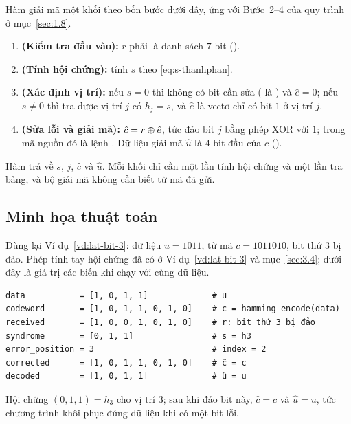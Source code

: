 Hàm  giải mã một khối theo bốn bước dưới đây, ứng với
Bước~2--4 của quy trình ở mục~\ref{sec:1.8}.
\begin{enumerate}[label=\textbf{Bước~\arabic*},leftmargin=2.3cm,labelwidth=1.7cm,labelsep=0.6em,align=left]
  \item \textbf{(Kiểm tra đầu vào):} $r$ phải là danh sách $7$ bit
        ().
  \item \textbf{(Tính hội chứng):} tính $s$ theo \eqref{eq:s-thanhphan}.
  \item \textbf{(Xác định vị trí):} nếu $s = 0$ thì không có bit cần sửa
        ( là ) và $\hat{e} = 0$; nếu
        $s \neq 0$ thì tra  được vị trí $j$ có $h_j = s$,
        và $\hat{e}$ là vectơ chỉ có bit $1$ ở vị trí $j$.
  \item \textbf{(Sửa lỗi và giải mã):} $\hat{c} = r \oplus \hat{e}$, tức đảo bit
        $j$ bằng phép XOR với $1$; trong mã nguồn đó là lệnh
        . Dữ liệu giải mã $\hat{u}$
        là $4$ bit đầu của $\hat{c}$ (\mbox{}).
\end{enumerate}
Hàm trả về $s$, $j$, $\hat{c}$ và $\hat{u}$. Mỗi khối chỉ cần một lần tính hội
chứng và một lần tra bảng, và bộ giải mã không cần biết từ mã đã gửi.

\subsection{Minh họa thuật toán}
\label{ss:4.3.4}

Dùng lại Ví dụ~\ref{vd:lat-bit-3}: dữ liệu $u = 1011$, từ mã $c = 1011010$, bit
thứ $3$ bị đảo. Phép tính tay hội chứng đã có ở Ví dụ~\ref{vd:lat-bit-3} và
mục~\ref{sec:3.4}; dưới đây là giá trị các biến khi chạy  với
cùng dữ liệu.
\begin{Verbatim}
data           = [1, 0, 1, 1]             # u
codeword       = [1, 0, 1, 1, 0, 1, 0]    # c = hamming_encode(data)
received       = [1, 0, 0, 1, 0, 1, 0]    # r: bit thứ 3 bị đảo
syndrome       = [0, 1, 1]                # s = h3
error_position = 3                        # index = 2
corrected      = [1, 0, 1, 1, 0, 1, 0]    # ĉ = c
decoded        = [1, 0, 1, 1]             # û = u
\end{Verbatim}
Hội chứng $(0,1,1) = h_3$ cho vị trí $3$; sau khi đảo bit này, $\hat{c} = c$ và
$\hat{u} = u$, tức chương trình khôi phục đúng dữ liệu khi có một bit lỗi.

